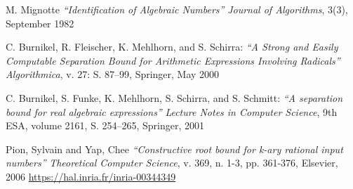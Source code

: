 %
%
\begin{thebibliography}{----}

M. Mignotte
\textit{“Identification of Algebraic Numbers”}
\textit{Journal of Algorithms},
3(3), September 1982

C. Burnikel, R. Fleischer, K. Mehlhorn, and S. Schirra:
\textit{“A Strong and Easily Computable Separation Bound for
Arithmetic Expressions Involving Radicals”}
\textit{Algorithmica},
v. 27: S. 87–99, Springer, May 2000

C. Burnikel, S. Funke, K. Mehlhorn, S. Schirra, and S. Schmitt:
\textit{“A separation bound for real algebraic expressions”}
\textit{Lecture Notes in Computer Science},
9th ESA, volume 2161, S. 254–265, Springer, 2001

Pion, Sylvain and Yap, Chee
\textit{“Constructive root bound for k-ary rational input numbers”}
\textit{Theoretical Computer Science},
v. 369, n. 1-3, pp. 361-376, Elsevier, 2006 \url{https://hal.inria.fr/inria-00344349}

\end{thebibliography}
%
%
